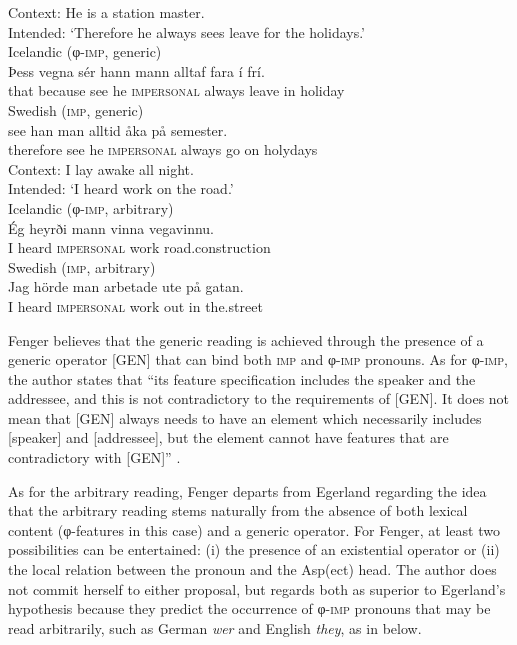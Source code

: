 \documentclass[output=paper]{langscibook}
\begin{document}
\ea\label{ex:avelar:16} Context: He is a station master.\\ {Intended: ‘Therefore he always sees} {} {leave for the holidays.’}\\
 \ea\label{ex:avelar:16a} Icelandic (φ-\textsc{imp}, generic)\\
  \gll {} Þess vegna   sér  hann   mann         alltaf     fara í frí.\\
        {} that because   see  he \textsc{impersonal} always   leave in holiday\\
 \ex\label{ex:avelar:16b} Swedish (\textsc{imp}, generic)\\
  see han man alltid åka på semester.\\
       {}  therefore   see he \textsc{impersonal}   always    go     on holydays\\
\z 
\ex\label{ex:avelar:17} Context: I lay awake all night.\\ {Intended: ‘I heard} {} {work on the road.’}\\
 \ea\label{ex:avelar:17a} Icelandic (φ-\textsc{imp}, arbitrary)\\
  \gll * Ég heyrði   mann         vinna   vegavinnu.\\
       {}  I   heard     \textsc{impersonal} work   road.construction\\
 \ex\label{ex:avelar:17b} Swedish (\textsc{imp}, arbitrary)\\
  \gll  * Jag   hörde   man         arbetade ute   på gatan.\\
        {} I     heard   \textsc{impersonal}   work out     in the.street\\
\z 
\z

Fenger believes that the generic reading is achieved through the presence of a generic operator [GEN] that can bind both \textsc{imp} and φ-\textsc{imp} pronouns. As for φ-\textsc{imp}, the author states that “its feature specification includes the speaker and the addressee, and this is not contradictory to the requirements of [GEN]. It does not mean that [GEN] always needs to have an element which necessarily includes [speaker] and [addressee], but the element cannot have features that are contradictory with [GEN]” \citep[310]{Fenger2018}.

{As for the arbitrary reading, Fenger departs from Egerland regarding the idea that the arbitrary reading stems naturally from the absence of both lexical content (φ-fea\-tures in this case) and a generic operator. For Fenger, at least two possibilities can be entertained: (i) the presence of an existential operator or (ii) the local relation between the pronoun and the Asp(ect) head. The author does not commit herself to either proposal, but regards both as superior to Egerland’s hypothesis because they predict the occurrence of φ-\textsc{imp} pronouns that may be read arbitrarily, such as German} {\textit{wer} }{and English} {\textit{they}}{, as in  below.}
\end{document}
